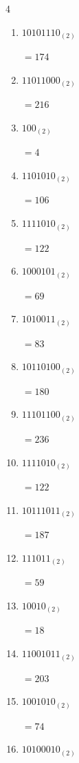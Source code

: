 \begin{multicols}{4}
\begin{enumerate}
        $=231$

  \item $10101110_{(2)}$

        $=174$

  \item $11011000_{(2)}$

        $=216$

  \item $100_{(2)}$

        $=4$

  \item $1101010_{(2)}$

        $=106$

  \item $1111010_{(2)}$

        $=122$

  \item $1000101_{(2)}$

        $=69$

  \item $1010011_{(2)}$

        $=83$

  \item $10110100_{(2)}$

        $=180$

  \item $11101100_{(2)}$

        $=236$

  \item $1111010_{(2)}$

        $=122$

  \item $10111011_{(2)}$

        $=187$

  \item $111011_{(2)}$

        $=59$

  \item $10010_{(2)}$

        $=18$

  \item $11001011_{(2)}$

        $=203$

\columnbreak %

  \item $1001010_{(2)}$

        $=74$

  \item $10100010_{(2)}$


\end{enumerate}
\end{multicols}

